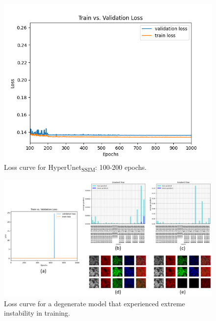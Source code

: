 \documentclass{article}
\begin{document}
\begin{figure}[!htb]
    \centering
    \includegraphics[width=\textwidth]{figs/ClassicUnetSSIM_LR/curves/loss_curve_zoom.png}
    \caption{Loss curve for HyperUnet\textsubscript{SSIM}: 100-200 epochs.}
    \label{fig:loss_curve_UnetSSIMzoom_model}
\end{figure}

\begin{figure}[!htb]
    \centering
    \includegraphics[width=\textwidth]{figs/loss_curve.png}
    \caption{Loss curve for a degenerate model that experienced extreme instability in training.}
    \label{fig:loss_curve_unstable}
\end{figure}
\end{document}
